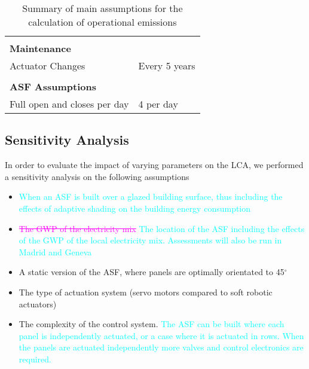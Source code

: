 \begin{description}
\begin{table}[H]
\begin{tabular}{ll}
                              &                                                \\
\textbf{Maintenance}          &                                                \\
Actuator Changes              & Every 5 years                                  \\
                              &                                                \\
\textbf{ASF Assumptions}         &                                                \\
Full open and closes per day  & 4 per day                                      \\
\hline
\end{tabular}
\caption{Summary of main assumptions for the calculation of operational emissions}
\label{tab:AssumptionsOpp}
\end{table}


\end{description}



\subsection{Sensitivity Analysis}
\label{ch:meth:sens}

In order to evaluate the impact of varying parameters on the LCA, we performed a sensitivity analysis on the following assumptions
\begin{itemize}
\item \textcolor{cyan}{When an ASF is built over a glazed building surface, thus including the effects of adaptive shading on the building energy consumption}
\item \textcolor{magenta}{\sout{The GWP of the electricity mix}} \textcolor{cyan}{The location of the ASF including the effects of the GWP of the local electricity mix. Assessments will also be run in Madrid and Geneva}
\item A static version of the ASF, where panels are optimally orientated to 45$^{\circ}$
\item The type of actuation system (servo motors compared to soft robotic actuators)
\item The complexity of the control system. \textcolor{cyan}{The ASF can be built where each panel is independently actuated, or a case where it is actuated in rows. When the panels are actuated independently more valves and control electronics are required.}
\end{itemize}

